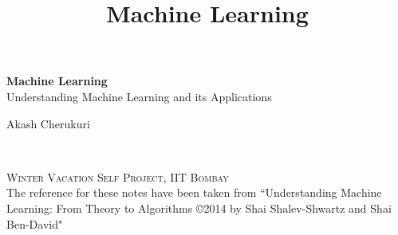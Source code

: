 \documentclass[11pt,oneside,onemany]{book} %
\begin{document}
\title{Machine Learning}


\begingroup
\thispagestyle{empty}
\centering
\vspace*{5cm}
\par\normalfont\fontsize{35}{35}\sffamily\selectfont
\textbf{Machine Learning}\\
{\LARGE Understanding Machine Learning and its Applications}\par %
\vspace*{1cm}
{\Huge Akash Cherukuri}\par %
\endgroup


\newpage
~\vfill


\noindent \textsc{Winter Vacation Self Project, IIT Bombay}\\


\noindent The reference for these notes have been taken from ``Understanding Machine Learning: From Theory to Algorithms \copyright 2014 by Shai Shalev-Shwartz and Shai Ben-David"\\ %





\tableofcontents %

\end{document}

